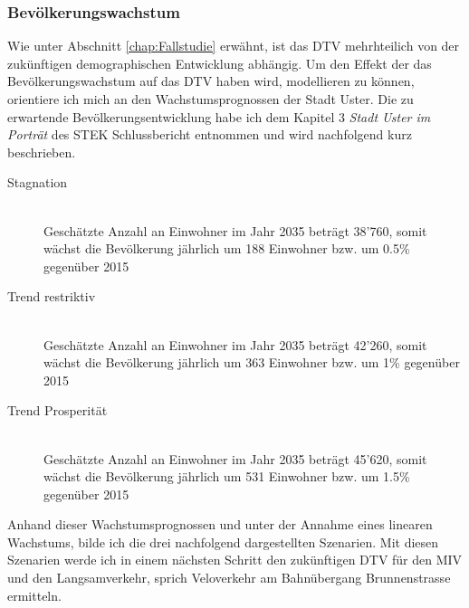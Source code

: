 %
%
%
%


\subsubsection*{Bevölkerungswachstum}
\label{subsubsec:Bevölkerung}

Wie unter Abschnitt \ref{chap:Fallstudie} erwähnt, ist das DTV mehrhteilich von der zukünftigen demographischen Entwicklung abhängig.
Um den Effekt der das Bevölkerungswachstum auf das DTV haben wird, modellieren zu können, orientiere ich mich an den Wachstumsprognossen der Stadt Uster.
Die zu erwartende Bevölkerungsentwicklung habe ich dem Kapitel 3 \textit{Stadt Uster im Porträt} des STEK Schlussbericht entnommen und wird nachfolgend kurz beschrieben. 

\begin{description}
\item[Stagnation] \hfill \\
Geschätzte Anzahl an Einwohner im Jahr 2035 beträgt 38'760, somit wächst die Bevölkerung jährlich um 188 Einwohner bzw. um 0.5\% gegenüber 2015
\item[Trend restriktiv] \hfill \\
Geschätzte Anzahl an Einwohner im Jahr 2035 beträgt 42'260, somit wächst die Bevölkerung jährlich um 363 Einwohner bzw. um 1\% gegenüber 2015
\item[Trend Prosperität] \hfill \\
Geschätzte Anzahl an Einwohner im Jahr 2035 beträgt 45'620, somit wächst die Bevölkerung jährlich um 531 Einwohner bzw. um 1.5\% gegenüber 2015
\end{description}

Anhand dieser Wachstumsprognossen und unter der Annahme eines linearen Wachstums, bilde ich die drei nachfolgend dargestellten Szenarien. Mit diesen Szenarien werde ich in einem nächsten Schritt den zukünftigen DTV für den MIV und den Langsamverkehr, sprich Veloverkehr am Bahnübergang Brunnenstrasse ermitteln.

